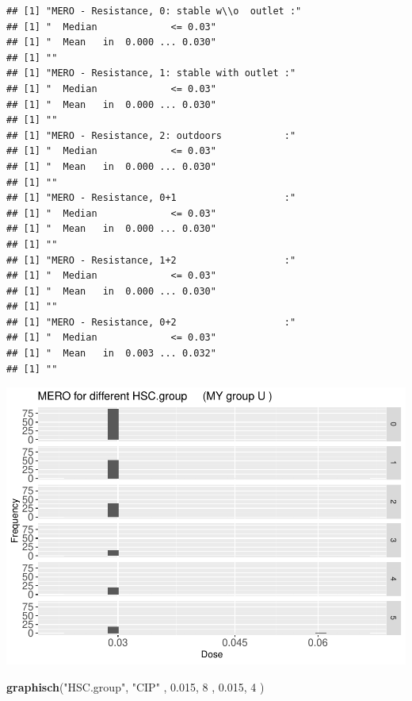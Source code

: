 \documentclass[
]{article}
\newenvironment{Shaded}{\begin{snugshade}}{\end{snugshade}}
\newcommand{\DecValTok}[1]{\textcolor[rgb]{0.00,0.00,0.81}{#1}}
\newcommand{\FloatTok}[1]{\textcolor[rgb]{0.00,0.00,0.81}{#1}}
\newcommand{\KeywordTok}[1]{\textcolor[rgb]{0.13,0.29,0.53}{\textbf{#1}}}
\newcommand{\NormalTok}[1]{#1}
\newcommand{\StringTok}[1]{\textcolor[rgb]{0.31,0.60,0.02}{#1}}
\begin{document}
\begin{verbatim}
## [1] "MERO - Resistance, 0: stable w\\o  outlet :"
## [1] "  Median             <= 0.03"
## [1] "  Mean   in  0.000 ... 0.030"
## [1] ""
## [1] "MERO - Resistance, 1: stable with outlet :"
## [1] "  Median             <= 0.03"
## [1] "  Mean   in  0.000 ... 0.030"
## [1] ""
## [1] "MERO - Resistance, 2: outdoors           :"
## [1] "  Median             <= 0.03"
## [1] "  Mean   in  0.000 ... 0.030"
## [1] ""
## [1] "MERO - Resistance, 0+1                   :"
## [1] "  Median             <= 0.03"
## [1] "  Mean   in  0.000 ... 0.030"
## [1] ""
## [1] "MERO - Resistance, 1+2                   :"
## [1] "  Median             <= 0.03"
## [1] "  Mean   in  0.000 ... 0.030"
## [1] ""
## [1] "MERO - Resistance, 0+2                   :"
## [1] "  Median             <= 0.03"
## [1] "  Mean   in  0.003 ... 0.032"
## [1] ""
\end{verbatim}

\includegraphics{Verteilungen_files/figure-latex/unnamed-chunk-45-1.pdf}

\begin{Shaded}
\begin{Highlighting}[]
  \KeywordTok{graphisch}\NormalTok{(}\StringTok{"HSC.group"}\NormalTok{, }\StringTok{"CIP"}\NormalTok{ , }\FloatTok{0.015}\NormalTok{,   }\DecValTok{8}\NormalTok{   ,   }\FloatTok{0.015}\NormalTok{,   }\DecValTok{4}\NormalTok{    ) }
\end{Highlighting}
\end{Shaded}
\end{document}
